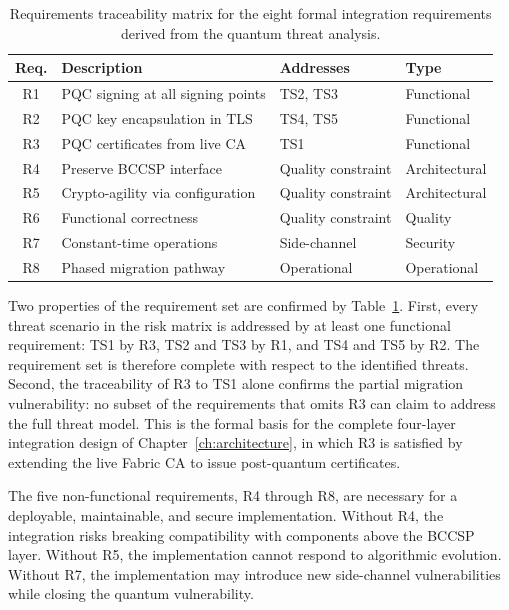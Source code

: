 \documentclass[conference]{IEEEtran}
\begin{document}
\begin{table}[ht]
\centering
\caption{Requirements traceability matrix for the eight formal integration
requirements derived from the quantum threat analysis.}
\label{tab:req_traceability}
\setlength{\tabcolsep}{5pt}
\footnotesize
\begin{tabular}{@{}cl>{\raggedright\arraybackslash}p{2.4cm}l@{}}
\toprule
\textbf{Req.} & \textbf{Description} & \textbf{Addresses} &
\textbf{Type} \\
\midrule
R1 & PQC signing at all signing points   & TS2, TS3          & Functional \\
R2 & PQC key encapsulation in TLS        & TS4, TS5          & Functional \\
R3 & PQC certificates from live CA       & TS1               & Functional \\
R4 & Preserve BCCSP interface            & Quality constraint & Architectural \\
R5 & Crypto-agility via configuration    & Quality constraint & Architectural \\
R6 & Functional correctness              & Quality constraint & Quality \\
R7 & Constant-time operations            & Side-channel       & Security \\
R8 & Phased migration pathway            & Operational        & Operational \\
\bottomrule
\end{tabular}
\end{table}

Two properties of the requirement set are confirmed by
Table~\ref{tab:req_traceability}. First, every threat scenario in the
risk matrix is addressed by at least one functional requirement: TS1 by
R3, TS2 and TS3 by R1, and TS4 and TS5 by R2. The requirement set is
therefore complete with respect to the identified threats. Second, the
traceability of R3 to TS1 alone confirms the partial migration
vulnerability: no subset of the requirements that omits R3 can claim
to address the full threat model. This is the formal basis for the
complete four-layer integration design of Chapter~\ref{ch:architecture},
in which R3 is satisfied by extending the live Fabric CA to issue
post-quantum certificates.

The five non-functional requirements, R4 through R8, are necessary for
a deployable, maintainable, and secure implementation. Without R4, the
integration risks breaking compatibility with components above the BCCSP
layer. Without R5, the implementation cannot respond to algorithmic
evolution. Without R7, the implementation may introduce new side-channel
vulnerabilities while closing the quantum vulnerability.
\end{document}
